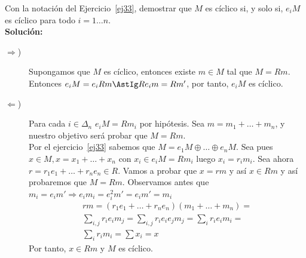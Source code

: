 \begin{ejercicio}
    Con la notación del Ejercicio~\ref{ej33}, demostrar que $M$ es cíclico si, y solo si, $e_iM$ es cíclico para todo $i=1\ldots n$. \\
    
    \noindent
    \textbf{Solución:}
    \begin{description}
        \item [$\Longrightarrow$)] Supongamos que $M$ es cíclico, entonces existe $m\in M$ tal que $M=Rm$. Entonces $e_iM = e_iRm \AstIg Re_im = Rm'$, por tanto, $e_iM$ es cíclico.
        \item [$\Longleftarrow$)] Para cada $i \in \Delta_n$ $e_iM = Rm_i$ por hipótesis. Sea $m = m_1 + \ldots + m_n$, y nuestro objetivo será probar que $M=Rm$.\\
            Por el ejercicio~\ref{ej33} sabemos que $M = e_1M \oplus \ldots \oplus e_nM$. Sea pues $x\in M, x=x_1+\ldots+x_n$ con $x_i \in e_iM = Rm_i$ luego $x_i = r_im_i$. Sea ahora $r=r_1e_1 + \ldots + r_ne_n \in R$. Vamos a probar que $x=rm$ y así $x\in Rm$ y así probaremos que $M = Rm$. Observamos antes que $m_i = e_im' \Longrightarrow e_im_i = e_i^2m' = e_im' = m_i$
            \begin{gather*}
                rm = (r_1e_1+\ldots+r_ne_n)(m_1+\ldots+m_n) =\\
                \sum_{i,j} r_ie_im_j= \sum_{i,j}r_ie_ie_jm_j = \sum_i r_ie_im_i = \\
                \sum_i r_im_i = \sum x_i = x
            \end{gather*}
            Por tanto, $x\in Rm$ y $M$ es cíclico.
    \end{description}
\end{ejercicio}

